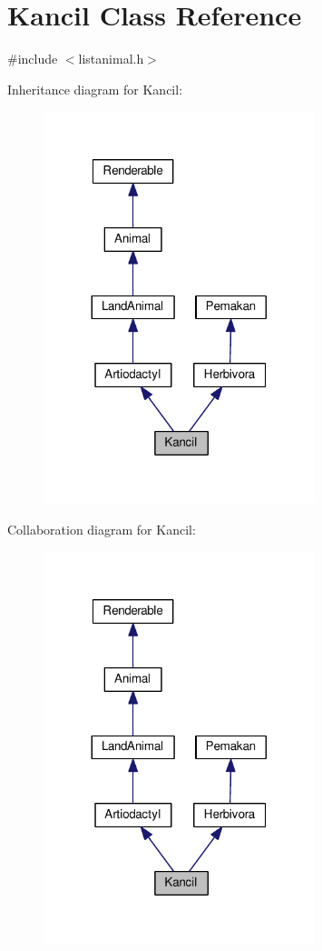 \hypertarget{classKancil}{}\section{Kancil Class Reference}
\label{classKancil}


{\ttfamily \#include $<$listanimal.\+h$>$}



Inheritance diagram for Kancil\+:
\nopagebreak
\begin{figure}[H]
\begin{center}
\leavevmode
\includegraphics[width=224pt]{classKancil__inherit__graph}
\end{center}
\end{figure}


Collaboration diagram for Kancil\+:
\nopagebreak
\begin{figure}[H]
\begin{center}
\leavevmode
\includegraphics[width=224pt]{classKancil__coll__graph}
\end{center}
\end{figure}
